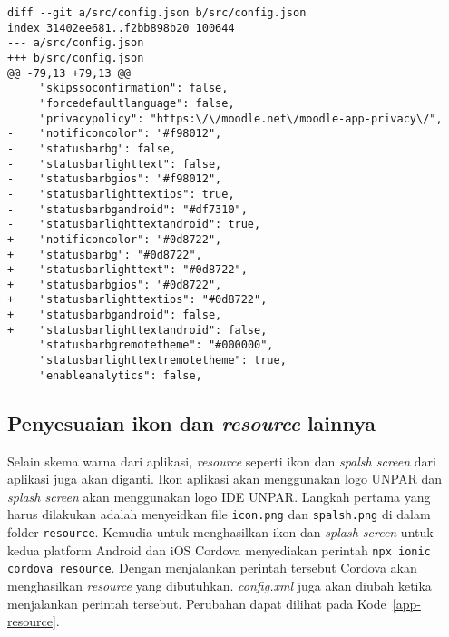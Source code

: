 \begin{lstlisting}[frame=single, label ={status-bar-color}, caption = Variable untuk mengubah warna dari \textit{status bar} pada config.json ]
diff --git a/src/config.json b/src/config.json
index 31402ee681..f2bb898b20 100644
--- a/src/config.json
+++ b/src/config.json
@@ -79,13 +79,13 @@
     "skipssoconfirmation": false,
     "forcedefaultlanguage": false,
     "privacypolicy": "https:\/\/moodle.net\/moodle-app-privacy\/",
-    "notificoncolor": "#f98012",
-    "statusbarbg": false,
-    "statusbarlighttext": false,
-    "statusbarbgios": "#f98012",
-    "statusbarlighttextios": true,
-    "statusbarbgandroid": "#df7310",
-    "statusbarlighttextandroid": true,
+    "notificoncolor": "#0d8722",
+    "statusbarbg": "#0d8722",
+    "statusbarlighttext": "#0d8722",
+    "statusbarbgios": "#0d8722",
+    "statusbarlighttextios": "#0d8722",
+    "statusbarbgandroid": false,
+    "statusbarlighttextandroid": false,
     "statusbarbgremotetheme": "#000000",
     "statusbarlighttextremotetheme": true,
     "enableanalytics": false,
\end{lstlisting}

\subsection{Penyesuaian ikon dan \textit{resource} lainnya}
Selain skema warna dari aplikasi, \textit{resource} seperti ikon dan \textit{spalsh screen} dari aplikasi juga akan diganti. Ikon aplikasi akan menggunakan logo UNPAR dan \textit{splash screen} akan menggunakan logo IDE UNPAR. Langkah pertama yang harus dilakukan adalah menyeidkan file \texttt{icon.png} dan \texttt{spalsh.png} di dalam folder \texttt{resource}. Kemudia untuk menghasilkan ikon dan \textit{splash screen} untuk kedua platform Android dan iOS Cordova menyediakan perintah \texttt{npx ionic cordova resource}. Dengan menjalankan perintah tersebut Cordova akan menghasilkan \textit{resource} yang dibutuhkan. \textit{config.xml} juga akan diubah ketika menjalankan perintah tersebut. Perubahan dapat dilihat pada \mbox{Kode \ref{app-resource}}.

